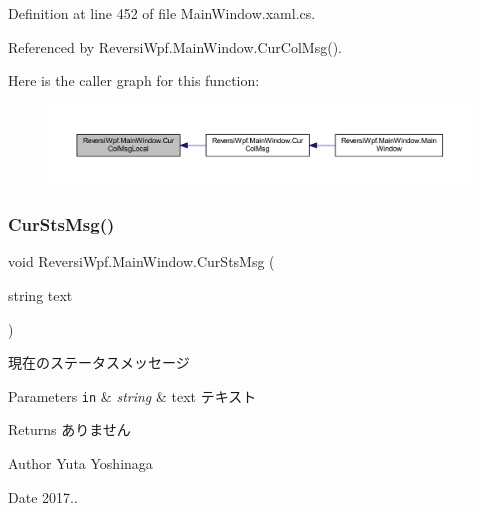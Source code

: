 Definition at line 452 of file Main\+Window.\+xaml.\+cs.



Referenced by Reversi\+Wpf.\+Main\+Window.\+Cur\+Col\+Msg().

Here is the caller graph for this function\+:\nopagebreak
\begin{figure}[H]
\begin{center}
\leavevmode
\includegraphics[width=350pt]{class_reversi_wpf_1_1_main_window_a92d45fe8b0224e36ce974e04388ec541_icgraph}
\end{center}
\end{figure}
\mbox{\label{class_reversi_wpf_1_1_main_window_a90e6aa75849526159fe9348da2b66fb0}} 
\subsubsection{\texorpdfstring{Cur\+Sts\+Msg()}{CurStsMsg()}}
{\footnotesize\ttfamily void Reversi\+Wpf.\+Main\+Window.\+Cur\+Sts\+Msg (\begin{DoxyParamCaption}\item[{string}]{text }\end{DoxyParamCaption})}



現在のステータスメッセージ 


\begin{DoxyParams}[1]{Parameters}
\mbox{\tt in}  & {\em string} & text テキスト \\
\hline
\end{DoxyParams}
\begin{DoxyReturn}{Returns}
ありません 
\end{DoxyReturn}
\begin{DoxyAuthor}{Author}
Yuta Yoshinaga 
\end{DoxyAuthor}
\begin{DoxyDate}{Date}
2017.. 
\end{DoxyDate}


